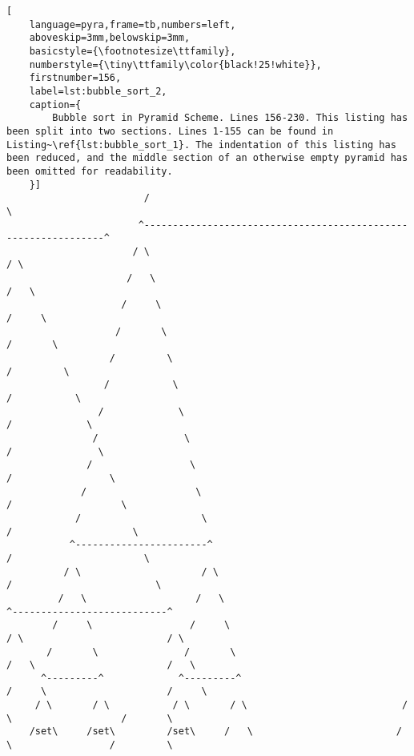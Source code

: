 \documentclass[aip,jcp,reprint,footinbib]{revtex4-1}
\begin{document}
\begin{lstlisting}[
    language=pyra,frame=tb,numbers=left,
    aboveskip=3mm,belowskip=3mm,
    basicstyle={\footnotesize\ttfamily},
    numberstyle={\tiny\ttfamily\color{black!25!white}},
    firstnumber=156,
    label=lst:bubble_sort_2,
    caption={
        Bubble sort in Pyramid Scheme. Lines 156-230. This listing has been split into two sections. Lines 1-155 can be found in Listing~\ref{lst:bubble_sort_1}. The indentation of this listing has been reduced, and the middle section of an otherwise empty pyramid has been omitted for readability.
    }]
                        /                                                             \
                       ^---------------------------------------------------------------^
                      / \                                                             / \
                     /   \                                                           /   \
                    /     \                                                         /     \
                   /       \                                                       /       \
                  /         \                                                     /         \
                 /           \                                                   /           \
                /             \                                                 /             \
               /               \                                               /               \
              /                 \                                             /                 \
             /                   \                                           /                   \
            /                     \                                         /                     \
           ^-----------------------^                                       /                       \
          / \                     / \                                     /                         \
         /   \                   /   \                                   ^---------------------------^
        /     \                 /     \                                 / \                         / \
       /       \               /       \                               /   \                       /   \
      ^---------^             ^---------^                             /     \                     /     \
     / \       / \           / \       / \                           /       \                   /       \
    /set\     /set\         /set\     /   \                         /         \                 /         \

\end{lstlisting}
\end{document}
